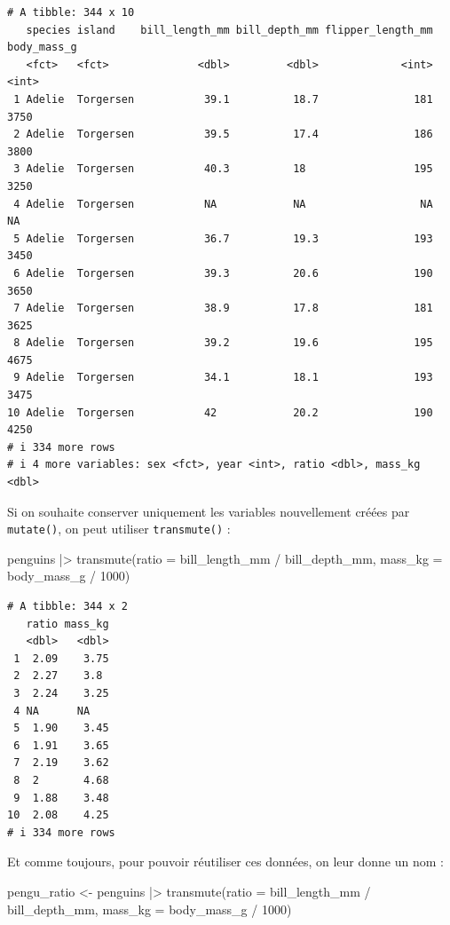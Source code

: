 \documentclass[
  a4paper,
  DIV=11,
  numbers=noendperiod,
  oneside]{scrreprt}
\newenvironment{Shaded}{}{}
\newcommand{\AttributeTok}[1]{\textcolor[rgb]{0.84,0.23,0.29}{#1}}
\newcommand{\DecValTok}[1]{\textcolor[rgb]{0.00,0.36,0.77}{#1}}
\newcommand{\FunctionTok}[1]{\textcolor[rgb]{0.44,0.26,0.76}{#1}}
\newcommand{\NormalTok}[1]{\textcolor[rgb]{0.14,0.16,0.18}{#1}}
\newcommand{\OtherTok}[1]{\textcolor[rgb]{0.44,0.26,0.76}{#1}}
\newcommand{\SpecialCharTok}[1]{\textcolor[rgb]{0.00,0.36,0.77}{#1}}
\begin{document}
\begin{verbatim}
# A tibble: 344 x 10
   species island    bill_length_mm bill_depth_mm flipper_length_mm body_mass_g
   <fct>   <fct>              <dbl>         <dbl>             <int>       <int>
 1 Adelie  Torgersen           39.1          18.7               181        3750
 2 Adelie  Torgersen           39.5          17.4               186        3800
 3 Adelie  Torgersen           40.3          18                 195        3250
 4 Adelie  Torgersen           NA            NA                  NA          NA
 5 Adelie  Torgersen           36.7          19.3               193        3450
 6 Adelie  Torgersen           39.3          20.6               190        3650
 7 Adelie  Torgersen           38.9          17.8               181        3625
 8 Adelie  Torgersen           39.2          19.6               195        4675
 9 Adelie  Torgersen           34.1          18.1               193        3475
10 Adelie  Torgersen           42            20.2               190        4250
# i 334 more rows
# i 4 more variables: sex <fct>, year <int>, ratio <dbl>, mass_kg <dbl>
\end{verbatim}

Si on souhaite conserver uniquement les variables nouvellement créées
par \texttt{mutate()}, on peut utiliser \texttt{transmute()} :

\begin{Shaded}
\begin{Highlighting}[]
\NormalTok{penguins }\SpecialCharTok{|\textgreater{}}
  \FunctionTok{transmute}\NormalTok{(}\AttributeTok{ratio =}\NormalTok{ bill\_length\_mm }\SpecialCharTok{/}\NormalTok{ bill\_depth\_mm,}
            \AttributeTok{mass\_kg =}\NormalTok{ body\_mass\_g }\SpecialCharTok{/} \DecValTok{1000}\NormalTok{)}
\end{Highlighting}
\end{Shaded}

\begin{verbatim}
# A tibble: 344 x 2
   ratio mass_kg
   <dbl>   <dbl>
 1  2.09    3.75
 2  2.27    3.8 
 3  2.24    3.25
 4 NA      NA   
 5  1.90    3.45
 6  1.91    3.65
 7  2.19    3.62
 8  2       4.68
 9  1.88    3.48
10  2.08    4.25
# i 334 more rows
\end{verbatim}

Et comme toujours, pour pouvoir réutiliser ces données, on leur donne un
nom :

\begin{Shaded}
\begin{Highlighting}[]
\NormalTok{pengu\_ratio }\OtherTok{\textless{}{-}}\NormalTok{  penguins }\SpecialCharTok{|\textgreater{}}
  \FunctionTok{transmute}\NormalTok{(}\AttributeTok{ratio =}\NormalTok{ bill\_length\_mm }\SpecialCharTok{/}\NormalTok{ bill\_depth\_mm,}
            \AttributeTok{mass\_kg =}\NormalTok{ body\_mass\_g }\SpecialCharTok{/} \DecValTok{1000}\NormalTok{)}
\end{Highlighting}
\end{Shaded}
\end{document}
